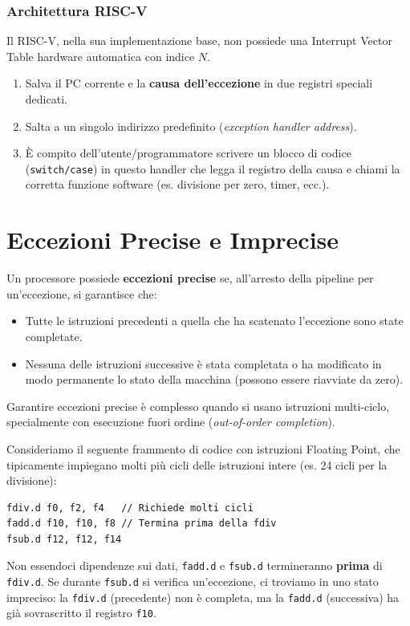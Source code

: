 \subsubsection{Architettura RISC-V}
Il RISC-V, nella sua implementazione base, non possiede una Interrupt Vector Table hardware automatica con indice $N$.
\begin{enumerate}
    \item Salva il PC corrente e la \textbf{causa dell'eccezione} in due registri speciali dedicati.
    \item Salta a un singolo indirizzo predefinito (\textit{exception handler address}).
    \item È compito dell'utente/programmatore scrivere un blocco di codice (\texttt{switch/case}) in questo handler che legga il registro della causa e chiami la corretta funzione software (es. divisione per zero, timer, ecc.).
\end{enumerate}

\section{Eccezioni Precise e Imprecise}
Un processore possiede \textbf{eccezioni precise} se, all'arresto della pipeline per un'eccezione, si garantisce che:
\begin{itemize}
    \item Tutte le istruzioni precedenti a quella che ha scatenato l'eccezione sono state completate.
    \item Nessuna delle istruzioni successive è stata completata o ha modificato in modo permanente lo stato della macchina (possono essere riavviate da zero).
\end{itemize}
Garantire eccezioni precise è complesso quando si usano istruzioni multi-ciclo, specialmente con esecuzione fuori ordine (\textit{out-of-order completion}).

\begin{example}
Consideriamo il seguente frammento di codice con istruzioni Floating Point, che tipicamente impiegano molti più cicli delle istruzioni intere (es. 24 cicli per la divisione):
\begin{verbatim}
fdiv.d f0, f2, f4   // Richiede molti cicli
fadd.d f10, f10, f8 // Termina prima della fdiv
fsub.d f12, f12, f14 
\end{verbatim}
Non essendoci dipendenze sui dati, \texttt{fadd.d} e \texttt{fsub.d} termineranno \textbf{prima} di \texttt{fdiv.d}. Se durante \texttt{fsub.d} si verifica un'eccezione, ci troviamo in uno stato impreciso: la \texttt{fdiv.d} (precedente) non è completa, ma la \texttt{fadd.d} (successiva) ha già sovrascritto il registro \texttt{f10}.
\end{example}

